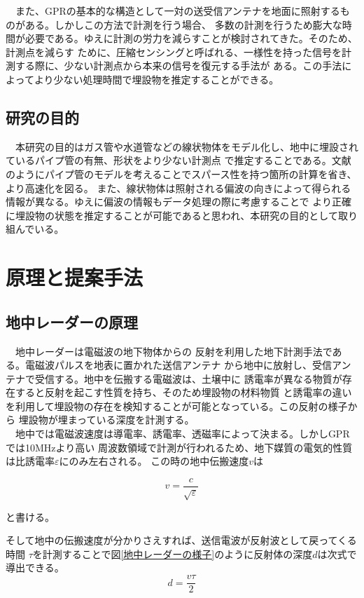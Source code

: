 \documentclass[a4paper,12pt]{jsreport}
\begin{document}
　また、GPRの基本的な構造として一対の送受信アンテナを地面に照射するものがある。しかしこの方法で計測を行う場合、
多数の計測を行うため膨大な時間が必要である。ゆえに計測の労力を減らすことが検討されてきた。そのため、計測点を減らす
ために、圧縮センシングと呼ばれる、一様性を持った信号を計測する際に、少ない計測点から本来の信号を復元する手法が
ある。この手法によってより少ない処理時間で埋設物を推定することができる。

\section{研究の目的}
　本研究の目的はガス管や水道管などの線状物体をモデル化し、地中に埋設されているパイプ管の有無、形状をより少ない計測点
で推定することである。文献\cite{imai}のようにパイプ管のモデルを考えることでスパース性を持つ箇所の計算を省き、より高速化を図る。
また、線状物体は照射される偏波の向きによって得られる情報が異なる。ゆえに偏波の情報もデータ処理の際に考慮することで
より正確に埋設物の状態を推定することが可能であると思われ、本研究の目的として取り組んでいる。





\chapter{原理と提案手法}
\section{地中レーダーの原理}
　地中レーダーは電磁波の地下物体からの
反射を利用した地下計測手法である。電磁波パルスを地表に置かれた送信アンテナ
から地中に放射し、受信アンテナで受信する。地中を伝搬する電磁波は、土壌中に
誘電率が異なる物質が存在すると反射を起こす性質を持ち、そのため埋設物の材料物質
と誘電率の違いを利用して埋設物の存在を検知することが可能となっている。この反射の様子から
埋設物が埋まっている深度を計測する。
\\　地中では電磁波速度は導電率、誘電率、透磁率によって決まる。しかしGPRでは10MHzより高い
周波数領域で計測が行われるため、地下媒質の電気的性質は比誘電率$\varepsilon$にのみ左右される。
この時の地中伝搬速度$v$は

\begin{equation}
  v =
  \frac{c}{\sqrt{\varepsilon}} 
  \end{equation}

と書ける。


そして地中の伝搬速度が分かりさえすれば、送信電波が反射波として戻ってくる時間
$\tau$を計測することで図\ref{地中レーダーの様子}のように反射体の深度$d$は次式で導出できる。
\begin{equation}
  d=
  \frac{v \tau}{2} 
  \end{equation}
  
\end{document}
